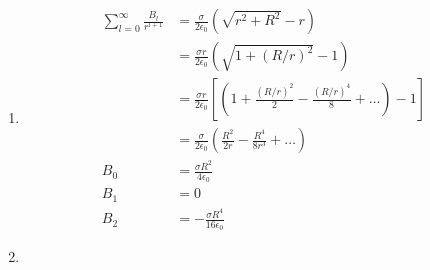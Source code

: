 \documentclass{article}
\begin{document}
\begin{enumerate}
  \item

        \begin{align*}
          \sum_{l = 0}^\infty \frac{B_l}{r^{l + 1}} & = \frac{\sigma}{2 \epsilon_0} \left( \sqrt{r^2 + R^2} - r \right)                                                        \\
                                                    & = \frac{\sigma r}{2 \epsilon_0} \left( \sqrt{1 + (R / r)^2} - 1 \right)                                                  \\
                                                    & = \frac{\sigma r}{2 \epsilon_0} \left[ \left( 1 + \frac{(R / r)^2}{2} - \frac{(R / r)^4}{8} + \ldots \right) - 1 \right] \\
                                                    & = \frac{\sigma}{2 \epsilon_0} \left( \frac{R^2}{2 r} - \frac{R^4}{8 r^3} + \ldots \right)                                \\
          B_0                                       & = \frac{\sigma R^2}{4 \epsilon_0}                                                                                        \\
          B_1                                       & = 0                                                                                                                      \\
          B_2                                       & = -\frac{\sigma R^4}{16 \epsilon_0}
        \end{align*}

  \item


\end{enumerate}
\end{document}
